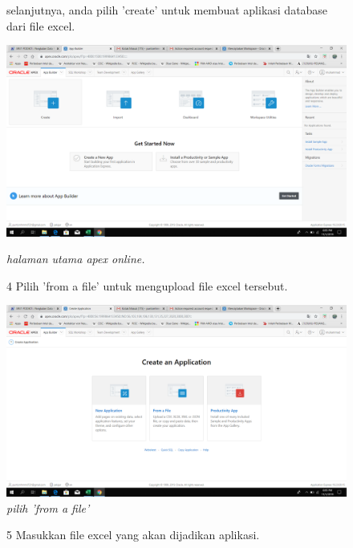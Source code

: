 \begin{enumerate}
\begin{figure}[!htbp]
selanjutnya, anda pilih 'create' untuk membuat aplikasi database dari file excel.

    \begin{center}
\includegraphics[scale=0.2]{figures/ss1.png}
    \caption{\textit{halaman utama apex online.}}
        \end{center}
        
\item[4]Pilih 'from a file' untuk mengupload file excel tersebut.  

    \begin{center}
\includegraphics[scale=0.2]{figures/ss2.png}
    \caption{\textit{pilih 'from a file'}}
        \end{center}
        \end{figure}
\begin{figure}
\item[5]Masukkan file excel yang akan dijadikan aplikasi.


\end{figure}
\end{enumerate}
